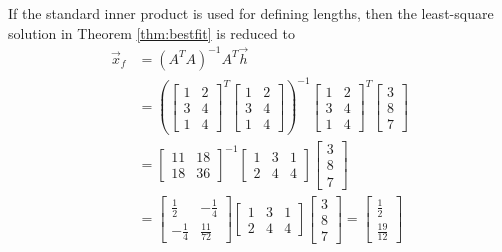 \begin{solution}
If the standard inner product is used for defining lengths, then the least-square solution in Theorem \ref{thm:bestfit} is reduced to
\begin{align*}
\vec{x}_f &= (A^TA)^{-1}A^T\vec{h} \\
&= 
\left(\begin{bmatrix}
1 & 2 \\
3 & 4 \\
1 & 4
\end{bmatrix}^T
\begin{bmatrix}
1 & 2 \\
3 & 4 \\
1 & 4
\end{bmatrix}\right)^{-1}
\begin{bmatrix}
1 & 2 \\
3 & 4 \\
1 & 4
\end{bmatrix}^T
\begin{bmatrix}
3 \\
8 \\
7
\end{bmatrix} \\
&=
\begin{bmatrix}
11 & 18 \\
18 & 36 
\end{bmatrix}^{-1}
\begin{bmatrix}
1 & 3 & 1\\
2 & 4 & 4
\end{bmatrix}
\begin{bmatrix}
3 \\
8 \\
7
\end{bmatrix} \\
&=
\begin{bmatrix}
\frac{1}{2}&-\frac{1}{4}\\
-\frac{1}{4}&\frac{11}{72}
\end{bmatrix}
\begin{bmatrix}
1 & 3 & 1\\
2 & 4 & 4
\end{bmatrix}
\begin{bmatrix}
3 \\
8 \\
7
\end{bmatrix}
=
\begin{bmatrix}
\frac{1}{2} \\
\frac{19}{12}
\end{bmatrix}
\end{align*}

\end{solution}
